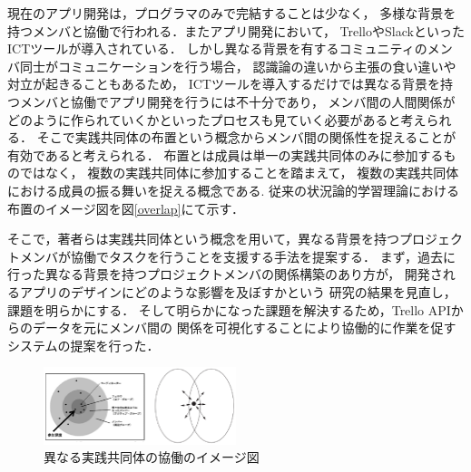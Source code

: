 
現在のアプリ開発は，プログラマのみで完結することは少なく，
多様な背景を持つメンバと協働で行われる．またアプリ開発において，
TrelloやSlackといったICTツールが導入されている．
しかし異なる背景を有するコミュニティのメンバ同士がコミュニケーションを行う場合，
認識論の違いから主張の食い違いや対立が起きることもあるため\cite{conflict}，
ICTツールを導入するだけでは異なる背景を持つメンバと協働でアプリ開発を行うには不十分であり，
メンバ間の人間関係がどのように作られていくかといったプロセスも見ていく必要があると考えられる．
そこで実践共同体\cite{Matsumoto}の布置という概念からメンバ間の関係性を捉えることが有効であると考えられる．
布置とは成員は単一の実践共同体のみに参加するものではなく，
複数の実践共同体に参加することを踏まえて，
複数の実践共同体における成員の振る舞いを捉える概念である.
従来の状況論的学習理論における布置のイメージ図を図\ref{overlap}にて示す．


そこで，著者らは実践共同体という概念を用いて，異なる背景を持つプロジェクトメンバが協働でタスクを行うことを支援する手法を提案する．
まず，過去に行った異なる背景を持つプロジェクトメンバの関係構築のあり方が，
開発されるアプリのデザインにどのような影響を及ぼすかという
研究の結果を見直し，課題を明らかにする．
そして明らかになった課題を解決するため，Trello APIからのデータを元にメンバ間の
関係を可視化することにより協働的に作業を促すシステムの提案を行った．

\begin{figure}[h]
  \centering
  \includegraphics[width=0.5\textwidth]{img/cop-overlap.eps}
  \caption{異なる実践共同体の協働のイメージ図}
  \label{cop-overlap}
\end{figure}
